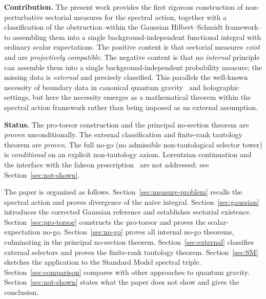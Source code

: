 \documentclass[12pt,a4paper]{article}
\theoremstyle{plain}
\theoremstyle{definition}
\theoremstyle{remark}
\begin{document}
\medskip

\noindent\textbf{Contribution.}\quad
The present work provides the first rigorous construction of
non-perturbative sectorial measures for the spectral action, together
with a classification of the obstruction--within the Gaussian
Hilbert--Schmidt framework--to assembling them into a single
background-independent functional integral with ordinary scalar
expectations.  The positive content is that sectorial
measures \emph{exist} and are \emph{projectively compatible}.  The
negative content is that no \emph{internal} principle can assemble them
into a single background-independent probability measure; the missing
data is \emph{external} and precisely classified.  This parallels the
well-known necessity of boundary data in canonical quantum
gravity~\cite{Surya:2019,AJL:2012} and holographic
settings, but here the necessity emerges as a mathematical theorem
within the spectral action framework rather than being imposed as an
external assumption.

\medskip

\noindent\textbf{Status.}\quad
The pro-torsor construction and the principal no-section theorem are
\emph{proven} unconditionally.  The external classification and
finite-rank tautology theorem are \emph{proven}.  The full no-go
(no admissible non-tautological selector tower) is \emph{conditional}
on an explicit non-tautology axiom.  Lorentzian continuation and the
interface with the fakeon prescription~\cite{Anselmi:2018} are not
addressed; see Section~\ref{sec:not-shown}.

\medskip

The paper is organized as follows.
Section~\ref{sec:measure-problem} recalls the spectral action and
proves divergence of the naive integral.
Section~\ref{sec:gaussian} introduces the corrected Gaussian reference
and establishes sectorial existence.
Section~\ref{sec:pro-torsor} constructs the pro-torsor and proves the
scalar-expectation no-go.
Section~\ref{sec:no-go} proves all internal no-go theorems, culminating
in the principal no-section theorem.
Section~\ref{sec:external} classifies external selectors and proves the
finite-rank tautology theorem.
Section~\ref{sec:SM} sketches the application to the Standard Model
spectral triple.
Section~\ref{sec:comparison} compares with other approaches to quantum
gravity.
Section~\ref{sec:not-shown} states what the paper does not show and
gives the conclusion.
\end{document}

